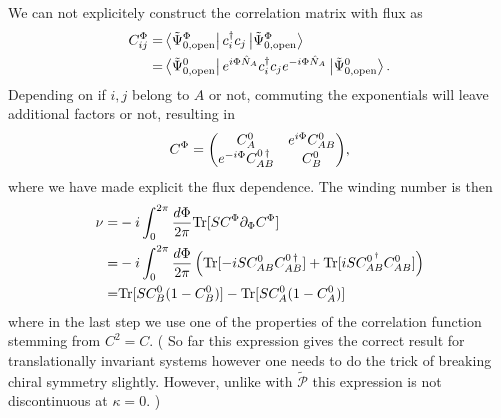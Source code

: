 \documentclass[twocolumn,amsmath,longbibliography,amssymb,superscriptaddress]{revtex4-1}
\newcommand{\carlos}[1]{{\color{red} #1}}
\begin{document}
We can not explicitely construct the correlation matrix with flux as
\begin{align*}
C_{ij}^\Phi =& \bra{\tilde{\Psi}_{0,{\rm open}}^\Phi}c_i^\dagger c_j \ket{\tilde{\Psi}_{0,{\rm open}}^\Phi} \\
=&\bra{\tilde{\Psi}_{0,{\rm open}}^0}e^{i\Phi \hat{N}_A} c_i^\dagger c_j e^{-i\Phi \hat{N}_A}\ket{\tilde{\Psi}_{0,{\rm open}}^0} .
\end{align*}
Depending on if $i,j$ belong to $A$ or not, commuting the exponentials will leave additional factors or not, resulting in
\begin{align*}
C^\Phi = \mqty(C_A^0 & e^{i\Phi} C_{AB}^0 \\e^{-i\Phi} C_{AB}^{0\,\dagger} &C_B^{0}),
\end{align*}
where we have made explicit the flux dependence. The winding number is then
\begin{align}
\nu =&  -i\int_0^{2\pi} \frac{d\Phi}{2\pi} {\rm Tr}[S C^\Phi \partial_\Phi C^\Phi] \\
=&  -i\int_0^{2\pi} \frac{d\Phi}{2\pi} \left( {\rm Tr}[-iS C_{AB}^0 C_{AB}^{0\,\dagger}]+{\rm Tr}[iS C_{AB}^{0\,^\dagger} C_{AB}^0] \right) \\
=&  {\rm Tr}[S C_B^0(1-C_B^0)]-{\rm Tr}[S C_A^0(1-C_A^0)] 
\end{align}
where in the last step we use one of the properties of the correlation function stemming from $C^2 = C$. (\carlos{So far this expression gives the correct result for translationally invariant systems however one needs to do the trick of breaking chiral symmetry slightly. However, unlike with $\tilde{\mathcal{P}}$ this expression is not discontinuous at $\kappa = 0$. })
\fi
\end{document}
